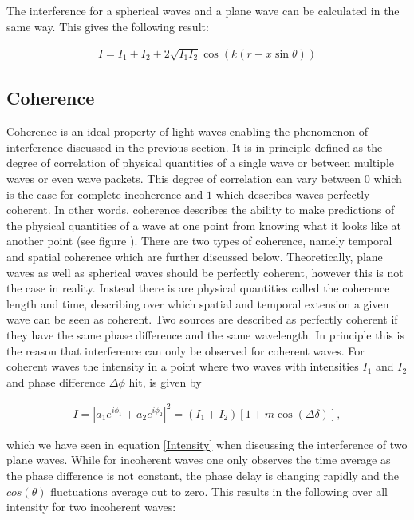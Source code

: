 
The interference for a spherical waves and a plane wave can be calculated in the same way. This gives the following result:

\begin{align}
I=I_1+I_2+2\sqrt{I_1I_2}\cos(k(r-x\sin\theta))
\end{align}



\subsection{Coherence}

Coherence is an ideal property of light waves enabling the phenomenon of interference discussed in the previous section. It is in principle defined as the degree of correlation of physical quantities of a single wave or between multiple waves or even wave packets. This degree of correlation can vary between $0$ which is the case for complete incoherence and $1$ which describes waves perfectly coherent. In other words, coherence describes the ability to make predictions of the physical quantities of a wave at one point from knowing what it looks like at another point (see figure ). There are two types of coherence, namely temporal and spatial coherence which are further discussed below. Theoretically, plane waves as well as spherical waves should be perfectly coherent, however this is not the case in reality. Instead there is are physical quantities called the coherence length and time, describing over which spatial and temporal extension a given wave can be seen as coherent. Two sources are described as perfectly coherent if they have the same phase difference and the same wavelength. In principle this is the reason that interference can only be observed for coherent waves. For coherent waves the intensity in a point where two waves with intensities $I_1$ and $I_2$ and phase difference $\Delta \phi$ hit, is given by

\begin{align}
I=\left| a_1 e^{i \phi_1} + a_2 e^{i \phi_2} \right|^2 = \left(I_1+I_2 \right) \left[ 1 + m \cos(\Delta \delta)\right], 
\end{align}

which we have seen in equation \ref{Intensity} when discussing the interference of two plane waves.
While for incoherent waves one only observes the time average as the phase difference is not constant, the phase delay is changing rapidly and the $cos(\theta)$ fluctuations average out to zero. This results in the following over all intensity for two incoherent waves:

